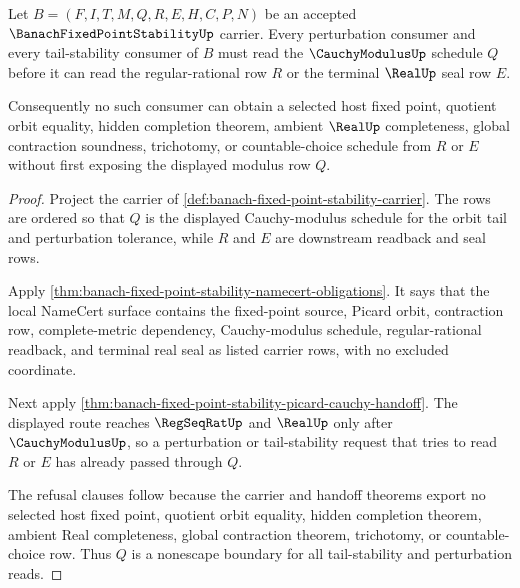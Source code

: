 \begin{theorem}
\label{thm:banach-fixed-point-stability-modulus-nonescape}
Let $B=(F,I,T,M,Q,R,E,H,C,P,N)$ be an accepted $\BanachFixedPointStabilityUp$ carrier. Every perturbation consumer and every tail-stability consumer of $B$ must read the $\CauchyModulusUp$ schedule $Q$ before it can read the regular-rational row $R$ or the terminal $\RealUp$ seal row $E$.

Consequently no such consumer can obtain a selected host fixed point, quotient orbit equality, hidden completion theorem, ambient $\RealUp$ completeness, global contraction soundness, trichotomy, or countable-choice schedule from $R$ or $E$ without first exposing the displayed modulus row $Q$.
\end{theorem}
\begin{proof}
Project the carrier of \autoref{def:banach-fixed-point-stability-carrier}. The rows are ordered so that $Q$ is the displayed Cauchy-modulus schedule for the orbit tail and perturbation tolerance, while $R$ and $E$ are downstream readback and seal rows.

Apply \autoref{thm:banach-fixed-point-stability-namecert-obligations}. It says that the local NameCert surface contains the fixed-point source, Picard orbit, contraction row, complete-metric dependency, Cauchy-modulus schedule, regular-rational readback, and terminal real seal as listed carrier rows, with no excluded coordinate.

Next apply \autoref{thm:banach-fixed-point-stability-picard-cauchy-handoff}. The displayed route reaches $\RegSeqRatUp$ and $\RealUp$ only after $\CauchyModulusUp$, so a perturbation or tail-stability request that tries to read $R$ or $E$ has already passed through $Q$.

The refusal clauses follow because the carrier and handoff theorems export no selected host fixed point, quotient orbit equality, hidden completion theorem, ambient Real completeness, global contraction theorem, trichotomy, or countable-choice row. Thus $Q$ is a nonescape boundary for all tail-stability and perturbation reads.
\end{proof}


